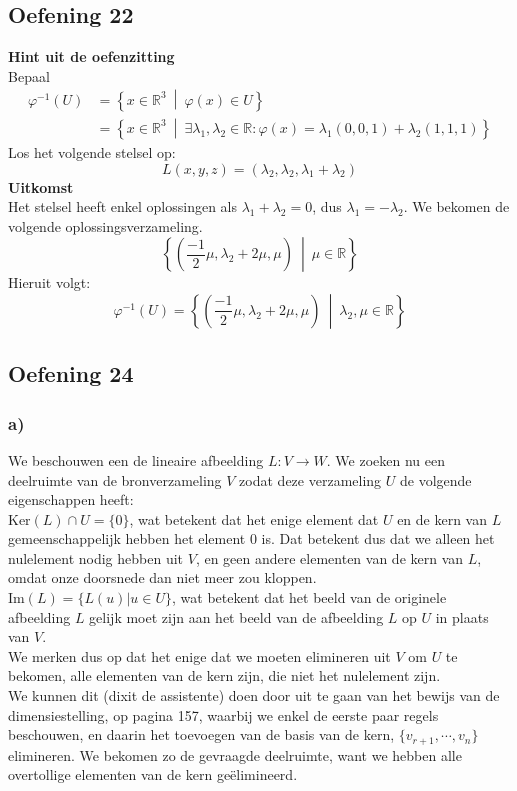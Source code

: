 \documentclass[lineaire_algebra_oplossingen.tex]{subfiles}
\begin{document}
\subsection{Oefening 22}
\textbf{Hint uit de oefenzitting}\\
Bepaal
\begin{align*}
\varphi^{-1}(U)
&= \left\{ x \in \mathbb{R}^3 \ \middle|\ \varphi(x) \in U \right\} \\
&= \left\{ x \in \mathbb{R}^3 \ \middle|\ \exists \lambda_1,\lambda_2 \in \mathbb{R} : \varphi(x) = \lambda_1 (0,0,1) + \lambda_2 (1,1,1) \right\}
\end{align*}
Los het volgende stelsel op:
\[
L(x,y,z) = (\lambda_2,\lambda_2,\lambda_1 + \lambda_2)
\]
\textbf{Uitkomst}\\
Het stelsel heeft enkel oplossingen als $\lambda_1 + \lambda_2 = 0$, dus $\lambda_1 = -\lambda_2$. We bekomen de volgende oplossingsverzameling.
\[
\left\{ \left( \frac{-1}{2} \mu , \lambda_2 + 2 \mu , \mu \right) \ \middle|\ \mu \in \mathbb{R} \right \}
\]
Hieruit volgt:
\[
\varphi^{-1}(U) = \left\{ \left( \frac{-1}{2} \mu , \lambda_2 + 2 \mu , \mu \right) \ \middle|\ \lambda_2,\mu \in \mathbb{R} \right \}
\]

\subsection{Oefening 24}
\subsubsection*{a)}
We beschouwen een de lineaire afbeelding $L:V\rightarrow W$. We zoeken nu een deelruimte van de bronverzameling $V$ zodat deze verzameling $U$ de volgende eigenschappen heeft:\\
$\text{Ker}(L)\cap U = \{0\}$, wat betekent dat het enige element dat $U$ en de kern van $L$ gemeenschappelijk hebben het element $0$ is. Dat betekent dus dat we alleen het nulelement nodig hebben uit $V$, en geen andere elementen van de kern van $L$, omdat onze doorsnede dan niet meer zou kloppen.\\
$\text{Im}(L) = \{L(u)| u\in U\}$, wat betekent dat het beeld van de originele afbeelding $L$ gelijk moet zijn aan het beeld van de afbeelding $L$ op $U$ in plaats van $V$.\\
We merken dus op dat het enige dat we moeten elimineren uit $V$ om $U$ te bekomen, alle elementen van de kern zijn, die niet het nulelement zijn.\\
We kunnen dit (dixit de assistente) doen door uit te gaan van het bewijs van de dimensiestelling, op pagina 157, waarbij we enkel de eerste paar regels beschouwen, en daarin het toevoegen van de basis van de kern, $\{v_{r+1},\cdots,v_n\}$ elimineren. We bekomen zo de gevraagde deelruimte, want we hebben alle overtollige elementen van de kern ge\"elimineerd.
\end{document}
